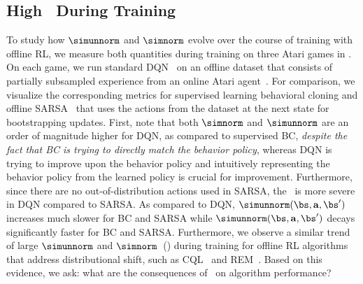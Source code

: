 \subsection{High \AliasingProblemName\ During Training}
\label{sec:bootstrapping_evidence}
To study how $\simunnorm$ and $\simnorm$ evolve over the course of training with offline RL, we measure both quantities during training on three Atari games in .
On each game, we run standard DQN~\citep{Mnih2015} on an offline dataset that consists of partially subsampled experience from an online Atari agent~\citep{agarwal2019optimistic}. For comparison, we visualize the corresponding metrics for supervised learning behavioral cloning and offline SARSA~\citep{rummery1994line} that uses the actions from the dataset at the next state for bootstrapping updates. First, note that both $\simnorm$ and $\simunnorm$ are an order of magnitude higher for DQN, as compared to supervised BC, \emph{despite the fact that BC is trying to directly match the behavior policy}, whereas DQN is trying to improve upon the behavior policy and intuitively representing the behavior policy from the learned policy is crucial for improvement. Furthermore, since there are no out-of-distribution actions used in SARSA, the \aliasingproblemname\ is more severe in DQN compared to SARSA.
As compared to DQN, $\simunnorm(\bs, \mathbf{a}, \bs')$ increases much slower for BC and SARSA while $\simunnorm(\bs, \mathbf{a}, \bs')$ decays significantly faster for BC and SARSA.
Furthermore, we observe a similar trend of large $\simunnorm$ and $\simnorm$~() during training for offline RL algorithms that address distributional shift, such as CQL~\citep{kumar2020conservative} and REM~\citep{agarwal2019optimistic}. Based on this evidence, we ask: 
what are the consequences of \aliasingproblemname\ on algorithm performance? 

